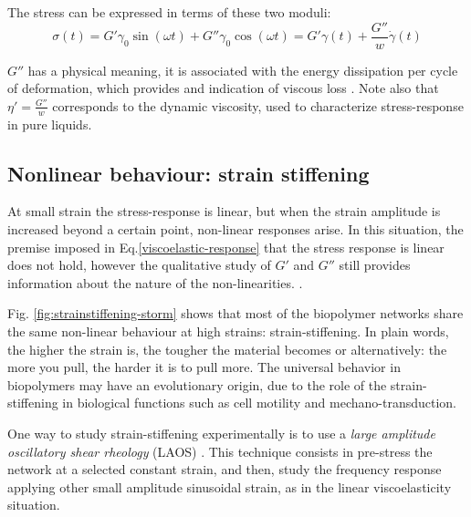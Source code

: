The stress can be expressed in terms of these two moduli:
\begin{equation}\label{viscoelastic-stress-G}
\sigma(t) = G'\gamma_0 \sin(\omega t) + G''\gamma_0\cos(\omega t) = G'\gamma(t)
 + \frac{G''}{w}\dot{\gamma}(t)
\end{equation}

$G''$ has a physical meaning, it is associated with the energy dissipation
per cycle of deformation, which provides and indication of viscous
loss \citep{macosko_rheology:_1994}. Note also that $\eta'=\frac{G''}{w}$
corresponds to the dynamic viscosity, used to characterize stress-response in pure liquids.

\subsection{Nonlinear behaviour: strain stiffening}
\label{intro-strainstiffening}
At small strain the stress-response is linear, but when the strain amplitude is
increased beyond a certain point, non-linear responses arise. In this situation,
the premise imposed in Eq.\ref{viscoelastic-response} that the stress response is linear does not
hold, however the qualitative study of $G'$ and $G''$ still provides information
about the nature of the non-linearities.
\citep{storm_nonlinear_2005,mackintosh_elasticity_1995,yao_nonlinear_2011,sheinman_nonlinear_2012,carrillo_nonlinear_2013}.

Fig. \ref{fig:strainstiffening-storm} shows that most of the biopolymer networks
share the same non-linear behaviour at high strains: strain-stiffening. In plain
words,  the higher the strain is, the tougher the material becomes or
alternatively:
the more you pull, the harder it is to pull more. The universal behavior in
biopolymers may have an evolutionary origin, due to the role of the strain-stiffening in biological functions such as cell motility
and mechano-transduction.

One way to study strain-stiffening experimentally is to use a \emph{large
amplitude oscillatory shear rheology} (LAOS) \citep{hyun_review_2011}. This
technique consists in pre-stress the network at a selected constant strain, and
then, study the frequency response applying other small amplitude sinusoidal strain, as in the
linear viscoelasticity situation.


